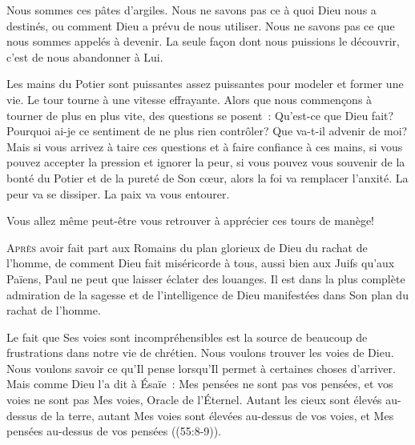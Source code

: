 Nous sommes ces pâtes d'argiles.
 Nous ne savons pas ce à quoi Dieu nous a destinés,
 ou comment Dieu a prévu de nous utiliser.
 Nous ne savons pas ce que nous sommes appelés à devenir.
 La seule façon dont nous puissions le découvrir,
 c'est de nous abandonner à Lui.


Les mains du Potier sont puissantes \ocadr assez puissantes pour modeler
 et former une vie. Le tour tourne à une vitesse effrayante.
 Alors que nous commençons à tourner de plus en plus vite,
 des questions se posent~: Qu'est-ce que Dieu fait?
 Pourquoi ai-je ce sentiment de ne plus rien contrôler?
 Que va-t-il advenir de moi? Mais si vous arrivez à taire ces questions
 et à faire confiance à ces mains, si vous pouvez accepter la pression
 et ignorer la peur, si vous pouvez vous souvenir de la bonté du Potier
 et de la pureté de Son c\oe{}ur, alors la foi va remplacer l'anxité.
 La peur va se dissiper. La paix va vous entourer.

Vous allez même peut-être vous retrouver à apprécier ces tours de manège!

\dvrule






\lettrine{A}{près} avoir fait part aux Romains
 du plan glorieux de Dieu du rachat de l'homme,
 de comment Dieu fait miséricorde à tous,
 aussi bien aux Juifs qu'aux Païens,
 Paul ne peut que laisser éclater des louanges.
 Il est dans la plus complète admiration de la sagesse
 et de l'intelligence de Dieu manifestées
 dans Son plan du rachat de l'homme.


Le fait que \og Ses voies sont incompréhensibles \fg{}
 est la source de beaucoup de frustrations dans notre vie de chrétien. 
 Nous voulons trouver les voies de Dieu. Nous voulons savoir ce qu'Il pense
 lorsqu'Il permet à certaines choses d'arriver.
 Mais comme Dieu l'a dit à Ésaïe~: 
 \og Mes pensées ne sont pas vos pensées, et vos voies ne sont pas Mes voies,
 \ocadr Oracle de l'Éternel. Autant les cieux sont élevés au-dessus
 de la terre, autant Mes voies sont élevées au-dessus de vos voies,
 et Mes pensées au-dessus de vos pensées \fg{}
 ((55:8-9)).

